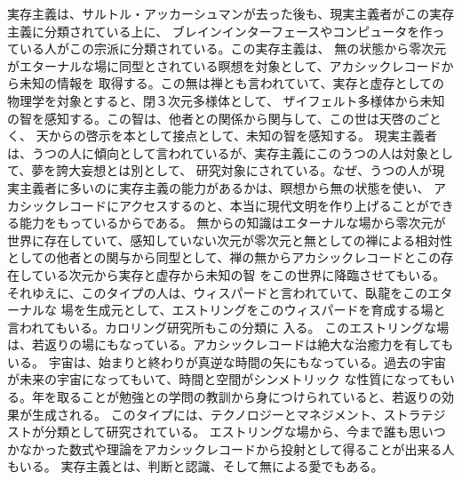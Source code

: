 \documentclass{jsarticle}
\begin{document}
   実存主義は、サルトル・アッカーシュマンが去った後も、現実主義者がこの実存主義に分類されている上に、
ブレインインターフェースやコンピュータを作っている人がこの宗派に分類されている。この実存主義は、
無の状態から零次元がエターナルな場に同型とされている瞑想を対象として、アカシックレコードから未知の情報を
取得する。この無は禅とも言われていて、実存と虚存としての物理学を対象とすると、閉３次元多様体として、
ザイフェルト多様体から未知の智を感知する。この智は、他者との関係から関与して、この世は天啓のごとく、
天からの啓示を本として接点として、未知の智を感知する。
現実主義者は、うつの人に傾向として言われているが、実存主義にこのうつの人は対象として、夢を誇大妄想とは別として、
研究対象にされている。なぜ、うつの人が現実主義者に多いのに実存主義の能力があるかは、瞑想から無の状態を使い、
アカシックレコードにアクセスするのと、本当に現代文明を作り上げることができる能力をもっているからである。
無からの知識はエターナルな場から零次元が世界に存在していて、感知していない次元が零次元と無としての禅による相対性
としての他者との関与から同型として、禅の無からアカシックレコードとこの存在している次元から実存と虚存から未知の智
をこの世界に降臨させてもいる。それゆえに、このタイプの人は、ウィスパードと言われていて、臥龍をこのエターナルな
場を生成元として、エストリングをこのウィスパードを育成する場と言われてもいる。カロリング研究所もこの分類に
入る。 このエストリングな場は、若返りの場にもなっている。アカシックレコードは絶大な治癒力を有してもいる。
宇宙は、始まりと終わりが真逆な時間の矢にもなっている。過去の宇宙が未来の宇宙になってもいて、時間と空間がシンメトリック
な性質になってもいる。年を取ることが勉強との学問の教訓から身につけられていると、若返りの効果が生成される。
このタイプには、テクノロジーとマネジメント、ストラテジストが分類として研究されている。
エストリングな場から、今まで誰も思いつかなかった数式や理論をアカシックレコードから投射として得ることが出来る人もいる。
実存主義とは、判断と認識、そして無による愛でもある。
　
  
\end{document}

